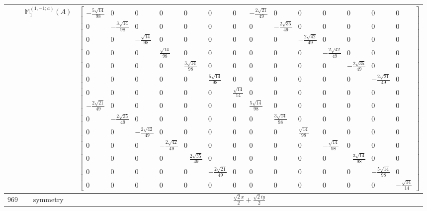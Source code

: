 \documentclass[fleqn,8pt,landscape]{jsarticle}
\begin{document}
\begin{longtable}{ccc}
$  $ & $ \mathbb{M}_{1}^{(1,-1;a)}(A) $ & $ \begin{bmatrix} - \frac{5 \sqrt{14}}{98} & 0 & 0 & 0 & 0 & 0 & 0 & - \frac{2 \sqrt{21}}{49} & 0 & 0 & 0 & 0 & 0 & 0 \\ 0 & - \frac{3 \sqrt{14}}{98} & 0 & 0 & 0 & 0 & 0 & 0 & - \frac{2 \sqrt{35}}{49} & 0 & 0 & 0 & 0 & 0 \\ 0 & 0 & - \frac{\sqrt{14}}{98} & 0 & 0 & 0 & 0 & 0 & 0 & - \frac{2 \sqrt{42}}{49} & 0 & 0 & 0 & 0 \\ 0 & 0 & 0 & \frac{\sqrt{14}}{98} & 0 & 0 & 0 & 0 & 0 & 0 & - \frac{2 \sqrt{42}}{49} & 0 & 0 & 0 \\ 0 & 0 & 0 & 0 & \frac{3 \sqrt{14}}{98} & 0 & 0 & 0 & 0 & 0 & 0 & - \frac{2 \sqrt{35}}{49} & 0 & 0 \\ 0 & 0 & 0 & 0 & 0 & \frac{5 \sqrt{14}}{98} & 0 & 0 & 0 & 0 & 0 & 0 & - \frac{2 \sqrt{21}}{49} & 0 \\ 0 & 0 & 0 & 0 & 0 & 0 & \frac{\sqrt{14}}{14} & 0 & 0 & 0 & 0 & 0 & 0 & 0 \\ - \frac{2 \sqrt{21}}{49} & 0 & 0 & 0 & 0 & 0 & 0 & \frac{5 \sqrt{14}}{98} & 0 & 0 & 0 & 0 & 0 & 0 \\ 0 & - \frac{2 \sqrt{35}}{49} & 0 & 0 & 0 & 0 & 0 & 0 & \frac{3 \sqrt{14}}{98} & 0 & 0 & 0 & 0 & 0 \\ 0 & 0 & - \frac{2 \sqrt{42}}{49} & 0 & 0 & 0 & 0 & 0 & 0 & \frac{\sqrt{14}}{98} & 0 & 0 & 0 & 0 \\ 0 & 0 & 0 & - \frac{2 \sqrt{42}}{49} & 0 & 0 & 0 & 0 & 0 & 0 & - \frac{\sqrt{14}}{98} & 0 & 0 & 0 \\ 0 & 0 & 0 & 0 & - \frac{2 \sqrt{35}}{49} & 0 & 0 & 0 & 0 & 0 & 0 & - \frac{3 \sqrt{14}}{98} & 0 & 0 \\ 0 & 0 & 0 & 0 & 0 & - \frac{2 \sqrt{21}}{49} & 0 & 0 & 0 & 0 & 0 & 0 & - \frac{5 \sqrt{14}}{98} & 0 \\ 0 & 0 & 0 & 0 & 0 & 0 & 0 & 0 & 0 & 0 & 0 & 0 & 0 & - \frac{\sqrt{14}}{14} \end{bmatrix} $ \\ \hline
$ 969 $ & $ \text{symmetry} $ & $ \frac{\sqrt{2} x}{2} + \frac{\sqrt{2} i y}{2} $ \\

\end{longtable}
\end{document}
